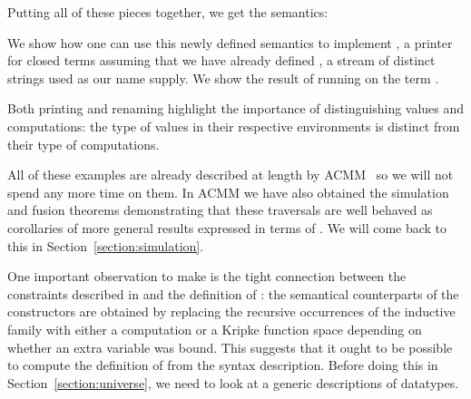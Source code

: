 \begin{agdasnippet}
\end{agdasnippet}

Putting all of these pieces together, we get the  semantics:

\begin{center}
\end{center}

We show how one can use this newly defined semantics to implement ,
a printer for closed terms assuming that we have already defined ,
a stream of distinct strings used as our name supply. We show the result of
running  on the term .

\noindent
\begin{minipage}[t]{0.5\textwidth}
\begin{agdasnippet}
\end{agdasnippet}
\end{minipage}
\quad
\begin{minipage}[t]{0.4\textwidth}
\begin{agdasnippet}
\end{agdasnippet}
\end{minipage}

Both printing and renaming highlight the importance of distinguishing
values and computations: the type of values in their respective
environments is distinct from their type of computations.

All of these examples are already described at length by ACMM~\citeyear{allais2017type}
so we will not spend any
more time on them. In ACMM we have also obtained the simulation and fusion
theorems demonstrating that these traversals are well behaved as
corollaries of more general results expressed in terms of \semfun{}.
We will come back to this in Section~\ref{section:simulation}.

One important observation to make is the tight connection between the constraints
described in \semrec{} and the definition of : the semantical counterparts
of the  constructors are obtained by replacing the recursive occurrences of
the inductive family with either a computation or a Kripke function space depending
on whether an extra variable was bound. This suggests that it ought to be possible
to compute the definition of \semrec{} from the syntax description. Before doing this
in Section~\ref{section:universe}, we need to look at a generic descriptions of
datatypes.



